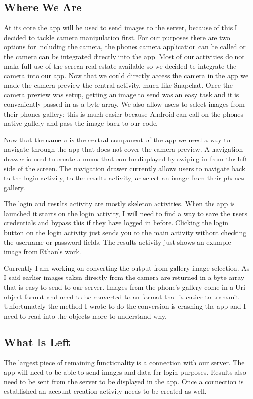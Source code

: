 \documentclass[onecolumn, draftclsnofoot,10pt, compsoc]{IEEEtran}
\begin{document}
	\subsection{Where We Are}
		At its core the app will be used to send images to the server, because of this I decided to tackle camera manipulation first.
		For our purposes there are two options for including the camera, the phones camera application can be called or the camera can be integrated directly into the app.
		Most of our activities do not make full use of the screen real estate available so we decided to integrate the camera into our app.
		Now that we could directly access the camera in the app we made the camera preview the central activity, much like Snapchat.
		Once the camera preview was setup, getting an image to send was an easy task and it is conveniently passed in as a byte array.
		We also allow users to select images from their phones gallery; this is much easier because Android can call on the phones native gallery and pass the image back to our code.

		Now that the camera is the central component of the app we need a way to navigate through the app that does not cover the camera preview.
		A navigation drawer is used to create a menu that can be displayed by swiping in from the left side of the screen.
		The navigation drawer currently allows users to navigate back to the login activity, to the results activity, or select an image from their phones gallery.

		The login and results activity are mostly skeleton activities.
		When the app is launched it starts on the login activity, I will need to find a way to save the users credentials and bypass this if they have logged in before.
		Clicking the login button on the login activity just sends you to the main activity without checking the username or password fields.
		The results activity just shows an example image from Ethan's work.

		Currently I am working on converting the output from gallery image selection.
		As I said earlier images taken directly from the camera are returned in a byte array that is easy to send to our server.
		Images from the phone's gallery come in a Uri object format and need to be converted to an format that is easier to transmit.
		Unfortunately the method I wrote to do the conversion is crashing the app and I need to read into the objects more to understand why.

	\subsection{What Is Left}
		The largest piece of remaining functionality is a connection with our server.
		The app will need to be able to send images and data for login purposes.
		Results also need to be sent from the server to be displayed in the app.
		Once a connection is established an account creation activity needs to be created as well.
\end{document}
